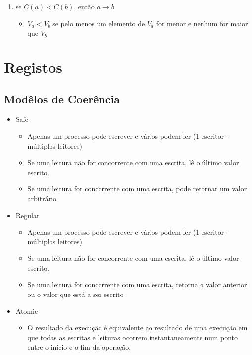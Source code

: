 \documentclass[12pt]{article}
\begin{document}
\begin{enumerate}
    \item se $C(a) < C(b)$, então $a \rightarrow b$
    \begin{itemize}[topsep=0pt]
        \item $V_a < V_b$ se pelo menos um elemento de $V_a$ for menor e nenhum for maior que $V_b$
    \end{itemize}
\end{enumerate}

\section{Registos}

\subsection{Modêlos de Coerência}

\begin{itemize}
    \item Safe
    \begin{itemize}[topsep=0pt]
        \item Apenas um processo pode escrever e vários podem ler (1 escritor - múltiplos leitores)
        \item Se uma leitura não for concorrente com uma escrita, lê o último valor escrito.
        \item Se uma leitura for concorrente com uma escrita, pode retornar um valor arbitrário
    \end{itemize}
    \item Regular
    \begin{itemize}[topsep=0pt]
        \item Apenas um processo pode escrever e vários podem ler (1 escritor - múltiplos leitores)
        \item Se uma leitura não for concorrente com uma escrita, lê o último valor escrito.
        \item Se uma leitura for concorrente com uma escrita, retorna o valor anterior ou o valor que está a ser escrito
    \end{itemize}
    \item Atomic
    \begin{itemize}[topsep=0pt]
        \item O resultado da execução é equivalente ao resultado de uma execução em que todas as escritas e leituras ocorrem instantaneamente num ponto entre o início e o fim da operação.
    \end{itemize}
\end{itemize}
\end{document}
